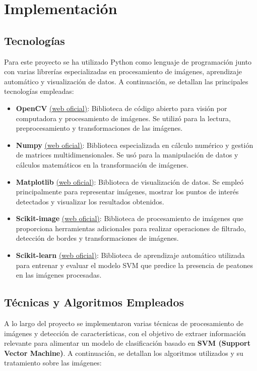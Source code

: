 \documentclass[a4paper]{article}
\begin{document}
\newpage

\section{Implementación}

\subsection{Tecnologías}

Para este proyecto se ha utilizado Python como lenguaje de programación junto con varias librerías especializadas en procesamiento de imágenes, aprendizaje automático y visualización de datos. A continuación, se detallan las principales tecnologías empleadas:

\begin{itemize}
\item \textbf{OpenCV} \href{https://opencv.org/}{(web oficial)}: Biblioteca de código abierto para visión por computadora y procesamiento de imágenes. Se utilizó para la lectura, preprocesamiento y transformaciones de las imágenes.
\item \textbf{Numpy} \href{https://numpy.org/}{(web oficial)}: Biblioteca especializada en cálculo numérico y gestión de matrices multidimensionales. Se usó para la manipulación de datos y cálculos matemáticos en la transformación de imágenes.
\item \textbf{Matplotlib} \href{https://matplotlib.org/}{(web oficial)}: Biblioteca de visualización de datos. Se empleó principalmente para representar imágenes, mostrar los puntos de interés detectados y visualizar los resultados obtenidos.
\item \textbf{Scikit-image} \href{https://scikit-image.org/}{(web oficial)}: Biblioteca de procesamiento de imágenes que proporciona herramientas adicionales para realizar operaciones de filtrado, detección de bordes y transformaciones de imágenes.
\item \textbf{Scikit-learn} \href{https://scikit-learn.org/}{(web oficial)}: Biblioteca de aprendizaje automático utilizada para entrenar y evaluar el modelo SVM que predice la presencia de peatones en las imágenes procesadas.
\end{itemize}

\subsection{Técnicas y Algoritmos Empleados}

A lo largo del proyecto se implementaron varias técnicas de procesamiento de imágenes y detección de características, con el objetivo de extraer información relevante para alimentar un modelo de clasificación basado en \textbf{SVM (Support Vector Machine)}. A continuación, se detallan los algoritmos utilizados y su tratamiento sobre las imágenes:
\end{document}
